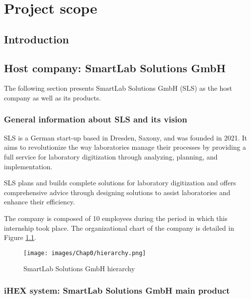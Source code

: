 \chapter{Project scope}

\renewcommand{\chaptername}{Chapter}

\section*{Introduction}


\begin{sloppypar}
\section{Host company: SmartLab Solutions GmbH}
\end{sloppypar}

The following section presents SmartLab Solutions GmbH (SLS) as the host company as well as its products.

\subsection{General information about SLS and its vision}

SLS is a German start-up based in Dresden, Saxony, and was founded in 2021. It aims to revolutionize the way laboratories manage their processes by providing a full service for laboratory digitization through analyzing, planning, and implementation.

SLS plans and builds complete solutions for laboratory digitization and offers comprehensive advice through designing solutions to assist laboratories and enhance their efficiency. \cite{R7}

The company is composed of 10 employees during the period in which this internship took place. The organizational chart of the company is detailed in Figure \ref{SLS Hierarchy}. \cite{R9}

\begin{figure}[H]
\begin{center}
\texttt{[image: images/Chap0/hierarchy.png]}\\
\caption{SmartLab Solutions GmbH hierarchy}
\label{SLS Hierarchy}
\end{center}
\end{figure} 

\subsection{iHEX system: SmartLab Solutions GmbH main product}

